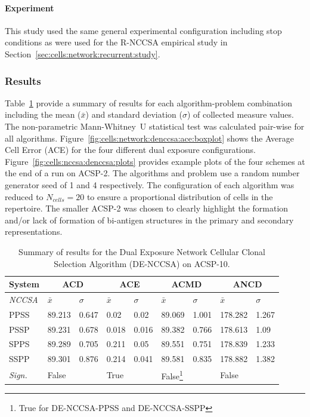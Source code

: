 %
%
\paragraph{Experiment}
This study used the same general experimental configuration including stop conditions as were used for the R-NCCSA empirical study in Section~\ref{sec:cells:network:recurrent:study}. 

%
%
\subsubsection{Results}
Table~\ref{tab:network:nccsa:denccsa:results} provide a summary of results for each algorithm-problem combination including the mean ($\bar{x}$) and standard deviation ($\sigma$) of collected measure values. The non-parametric Mann-Whitney~U statistical test was calculated pair-wise for all algorithms. 
Figure~\ref{fig:cells:network:denccsa:ace:boxplot} shows the Average Cell Error (ACE) for the four different dual exposure configurations. 
Figure~\ref{fig:cells:nccsa:denccsa:plots} provides example plots of the four schemes at the end of a run on ACSP-2. The algorithms and problem use a random number generator seed of 1 and 4 respectively. The configuration of each algorithm was reduced to $N_{cells}=20$ to ensure a proportional distribution of cells in the repertoire. The smaller ACSP-2 was chosen to clearly highlight the formation and/or lack of formation of bi-antigen structures in the primary and secondary representations.

\begin{table}[htp]
	\centering\small
		\begin{minipage}{0.80\textwidth}
		\centering
		\begin{tabular}{lllllllll}
		\toprule
		\textbf{System} & \multicolumn{2}{c}{\textbf{ACD}} & \multicolumn{2}{c}{\textbf{ACE}} & \multicolumn{2}{c}{\textbf{ACMD}} & \multicolumn{2}{c}{\textbf{ANCD}}\\
		\midrule
		\emph{NCCSA} & $\bar{x}$ & $\sigma$ & $\bar{x}$ & $\sigma$ & $\bar{x}$ & $\sigma$ & $\bar{x}$ & $\sigma$\\
		\toprule
		PPSS & 89.213 & 0.647 & 0.02 & 0.02 & 89.069 & 1.001 & 178.282 & 1.267 \\
		PSSP & 89.231 & 0.678 & 0.018 & 0.016 & 89.382 & 0.766 & 178.613 & 1.09 \\
		SPPS & 89.289 & 0.705 & 0.211 & 0.05 & 89.551 & 0.751 & 178.839 & 1.233 \\
		SSPP & 89.301 & 0.876 & 0.214 & 0.041 & 89.581 & 0.835 & 178.882 & 1.382 \\
		\emph{Sign.} & False &  & True &  & False\footnote{True for DE-NCCSA-PPSS and DE-NCCSA-SSPP} &  & False & \\
		\bottomrule
		\end{tabular}	
		\end{minipage}		
	\caption{Summary of results for the Dual Exposure Network Cellular Clonal Selection Algorithm (DE-NCCSA) on ACSP-10.}
	\label{tab:network:nccsa:denccsa:results}
\end{table}

